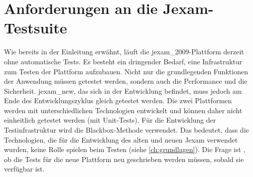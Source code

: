 \section{Anforderungen an die Jexam-Testsuite}

Wie bereits in der Einleitung erwähnt, läuft die \Gls{jexam_2009}-Plattform
derzeit ohne automatische Tests. Es besteht ein dringender Bedarf, eine
Infrastruktur zum Testen der Plattform aufzubauen. Nicht nur die
grundlegenden Funktionen der Anwendung müssen getestet werden, sondern auch
die Performance und die Sicherheit. \Gls{jexam_new}, das sich in der Entwicklung
befindet, muss jedoch am Ende des Entwicklungszyklus gleich getestet werden.
Die zwei Plattformen werden mit unterschiedlichen Technologien entwickelt
und können daher nicht einheitlich getestet werden (mit Unit-Tests). Für
die Entwicklung der Testinfrastruktur wird die Blackbox-Methode verwendet.
Das bedeutet, dass die Technologien, die für die Entwicklung des alten und neuen Jexam verwendet wurden,
keine Rolle spielen beim Testen (siehe \autoref{ch:grundlagen}).
Die Frage ist , ob die Tests für die neue Plattform neu geschrieben werden
müssen, sobald sie verfügbar ist.




